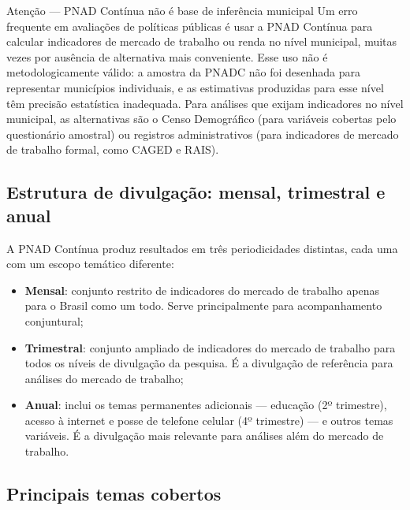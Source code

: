 \begin{boxatencao}{Atenção --- PNAD Contínua não é base de inferência municipal}
Um erro frequente em avaliações de políticas públicas é usar a PNAD Contínua para calcular indicadores de mercado de trabalho ou renda no nível municipal, muitas vezes por ausência de alternativa mais conveniente. Esse uso não é metodologicamente válido: a amostra da PNADC não foi desenhada para representar municípios individuais, e as estimativas produzidas para esse nível têm precisão estatística inadequada. Para análises que exijam indicadores no nível municipal, as alternativas são o Censo Demográfico (para variáveis cobertas pelo questionário amostral) ou registros administrativos (para indicadores de mercado de trabalho formal, como CAGED e RAIS).
\end{boxatencao}

\subsection{Estrutura de divulgação: mensal, trimestral e anual}

A PNAD Contínua produz resultados em três periodicidades distintas, cada uma com um escopo temático diferente:

\begin{itemize}
  \item \textbf{Mensal}: conjunto restrito de indicadores do mercado de trabalho apenas para o Brasil como um todo. Serve principalmente para acompanhamento conjuntural;

  \item \textbf{Trimestral}: conjunto ampliado de indicadores do mercado de trabalho para todos os níveis de divulgação da pesquisa. É a divulgação de referência para análises do mercado de trabalho;

  \item \textbf{Anual}: inclui os temas permanentes adicionais --- educação (2º trimestre), acesso à internet e posse de telefone celular (4º trimestre) --- e outros temas variáveis. É a divulgação mais relevante para análises além do mercado de trabalho.
\end{itemize}

\subsection{Principais temas cobertos}

